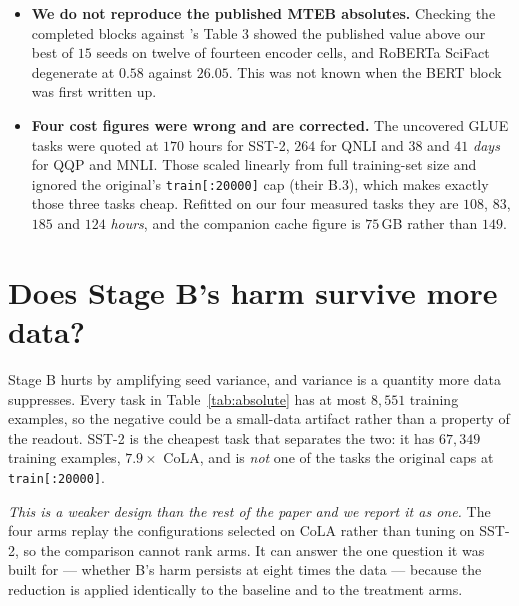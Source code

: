 \documentclass{article}
\begin{document}
\begin{itemize}
      the relaunched RoBERTa block was then skipped entirely by a
      model-name mismatch that spent no compute and stopped nothing
      (Appendix~\ref{app:mteb3}). Both are our defects, not the original's.
\item \textbf{We do not reproduce the published MTEB absolutes.} Checking the
      completed blocks against \citet{mantri2026glot}'s Table 3 showed the
      published value above our best of $15$ seeds on twelve of fourteen encoder
      cells, and RoBERTa SciFact degenerate at $0.58$ against $26.05$. This was
      not known when the BERT block was first written up.
\item \textbf{Four cost figures were wrong and are corrected.} The uncovered
      GLUE tasks were quoted at $170$ hours for SST-2, $264$ for QNLI and $38$
      and $41$ \emph{days} for QQP and MNLI. Those scaled linearly from full
      training-set size and ignored the original's \texttt{train[:20000]} cap
      (their B.3), which makes exactly those three tasks cheap. Refitted on our
      four measured tasks they are $108$, $83$, $185$ and $124$ \emph{hours},
      and the companion cache figure is $75$\,GB rather than $149$.
\end{itemize}

\section{Does Stage B's harm survive more data?}
\label{app:sst2}

Stage B hurts by amplifying seed variance, and variance is a quantity more data
suppresses. Every task in Table~\ref{tab:absolute} has at most $8{,}551$
training examples, so the negative could be a small-data artifact rather than a
property of the readout. SST-2 is the cheapest task that separates the two: it
has $67{,}349$ training examples, $7.9\times$ CoLA, and is \emph{not} one of the
tasks the original caps at \texttt{train[:20000]}.

\emph{This is a weaker design than the rest of the paper and we report it as
one.} The four arms replay the configurations selected on CoLA rather than
tuning on SST-2, so the comparison cannot rank arms. It can answer the one
question it was built for --- whether B's harm persists at eight times the data
--- because the reduction is applied identically to the baseline and to the
treatment arms.
\end{document}
